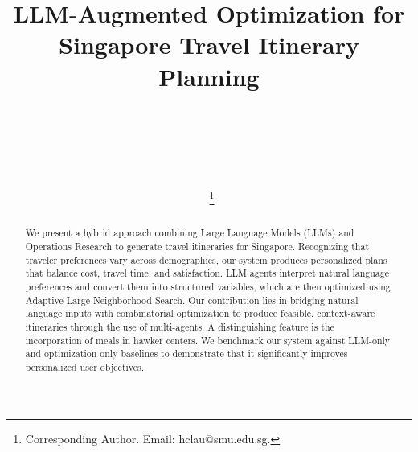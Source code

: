 \documentclass{ecai}
\begin{document}

\begin{frontmatter}




\title{LLM-Augmented Optimization for Singapore Travel Itinerary Planning}


\author[A]
{~}

\author[A]
{}

\author[A]
{~}

\author[A]
{~}

\author[A]
{~\thanks{Corresponding Author. Email: hclau@smu.edu.sg.}}

\address[A]{School of Computing and Information Systems, Singapore Management University}


\begin{abstract}
We present a hybrid approach combining Large Language Models (LLMs) and Operations Research to generate travel itineraries for Singapore. Recognizing that traveler preferences vary across demographics, our system produces personalized plans that balance cost, travel time, and satisfaction. LLM agents interpret natural language preferences and convert them into structured variables, which are then optimized using Adaptive Large Neighborhood Search. Our contribution lies in bridging natural language inputs with combinatorial optimization to produce feasible, context-aware itineraries through the use of multi-agents. A distinguishing feature is the incorporation of meals in hawker centers. We benchmark our system against LLM-only and optimization-only baselines to demonstrate that it significantly improves personalized user objectives. 
\end{abstract}

\end{frontmatter}
\end{document}

